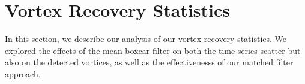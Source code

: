 \documentclass{aastex63}
\begin{document}
\acknowledgments

%

\vspace{5mm}
\facilities{}


\software{}



\appendix

\section{Vortex Recovery Statistics}
\label{sec:Vortex Recovery Statistics}
In this section, we describe our analysis of our vortex recovery statistics. We explored the effects of the mean boxcar filter on both the time-series scatter but also on the detected vortices, as well as the effectivenesss of our matched filter approach.
\end{document}
